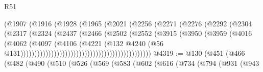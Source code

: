 \begin{lexlean}{R51}
\begin{coremodule}
                                              (@1907
                                                (@1916
                                                  (@1928
                                                    (@1965
                                                      (@2021
                                                        (@2256
                                                          (@2271
                                                            (@2276
                                                              (@2292
                                                                (@2304
                                                                  (@2317
                                                                    (@2324
                                                                      (@2437
                                                                        (@2466
                                                                          (@2502
                                                                            (@2552
                                                                              (@3915
                                                                                (@3950
                                                                                  (@3959
                                                                                    (@4016
                                                                                      (@4062
                                                                                        (@4097
                                                                                          (@4106
                                                                                            (@4221
                                                                                              (@132
                                                                                                @4240
                                                                                                (@56
                                                                                                  @131)))))))))))))))))))))))))))))))))))))))))))))))
@4319 := @130
    (@451
      (@466
        (@482
          (@490
            (@510
              (@526
                (@569
                  (@583
                    (@602
                      (@616
                        (@734
                          (@794
                            (@931
                              (@943

\end{coremodule}
\end{lexlean}
